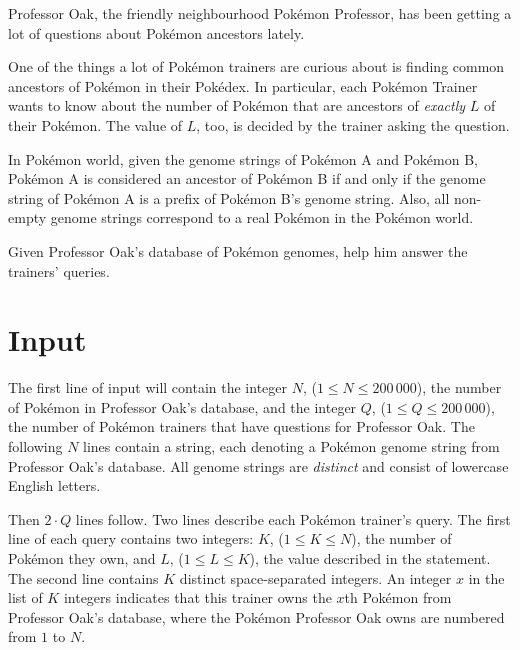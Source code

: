 


Professor Oak, the friendly neighbourhood Pokémon Professor, has been getting a 
lot of questions about Pokémon ancestors lately.

One of the things a lot of Pokémon trainers are curious about is finding 
common ancestors of Pokémon in their Pokédex. In particular, each 
Pokémon Trainer wants to know about the number of Pokémon that are 
ancestors of \textit{exactly} $L$ of their Pokémon. The value of 
$L$, too, is decided by the trainer asking the question.

In Pokémon world, given the genome strings of Pokémon A and Pokémon B, Pokémon A 
is considered an ancestor of Pokémon B if and only if the genome string of 
Pokémon A is a prefix of Pokémon B's genome string. Also, all non-empty 
genome strings correspond to a real Pokémon in the Pokémon world.

Given Professor Oak's database of Pokémon genomes, help him 
answer the trainers' queries.

\section*{Input}

The first line of input will contain the integer $N$, ($1 \leq N \leq 200\,000$), 
the number of Pokémon in Professor Oak's database, and the integer 
$Q$, ($1 \leq Q \leq 200\,000$), the number of Pokémon trainers that have 
questions for Professor Oak. The following $N$ lines contain a string, each denoting a 
Pokémon genome string from Professor Oak’s database. 
All genome strings are \textit{distinct} and consist of lowercase English letters.

Then $2 \cdot Q$ lines follow. Two lines describe each Pokémon trainer's query.
The first line of each query contains two integers: $K$, ($1 \leq K \leq N$), the number of 
Pokémon they own, and $L$, ($1 \leq L \leq K$), the value described in the statement. The 
second line contains $K$ distinct space-separated integers. An integer $x$ in the list of 
$K$ integers indicates that this trainer owns the $x$th Pokémon from Professor Oak's 
database, where the Pokémon Professor Oak owns are numbered from $1$ to $N$.


